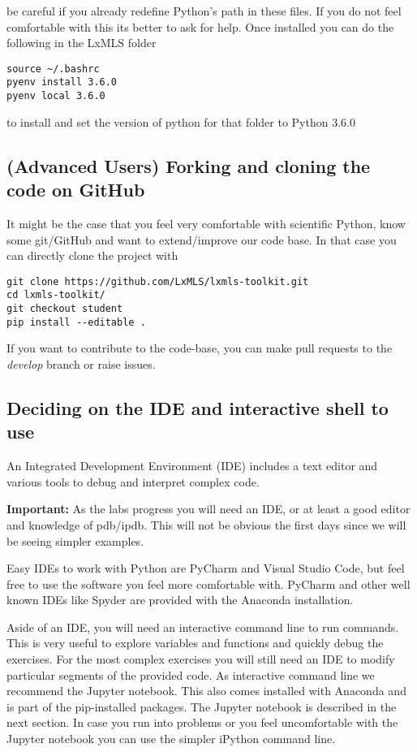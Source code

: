 be careful if you already redefine Python's path in these files. If you do not feel comfortable with this its better to ask for help. Once installed you can do the following in the LxMLS folder

\begin{verbatim}
source ~/.bashrc
pyenv install 3.6.0 
pyenv local 3.6.0
\end{verbatim}

\noindent to install and set the version of python for that folder to Python 3.6.0


\subsection{(Advanced Users) Forking and cloning the code on GitHub}

It might be the case that you feel very comfortable with scientific Python, know some git/GitHub and want to extend/improve our code base. In that case you can directly clone the project with

\begin{verbatim}
git clone https://github.com/LxMLS/lxmls-toolkit.git 
cd lxmls-toolkit/
git checkout student
pip install --editable .
\end{verbatim}

\noindent If you want to contribute to the code-base, you can make pull requests to the \textit{develop} branch or raise issues.

\subsection{Deciding on the IDE and interactive shell to use}

An Integrated Development Environment (IDE) includes a text editor and various tools to debug and interpret complex code. 

\textbf{Important:} As the labs progress you will need an IDE, or at least a good editor and knowledge of pdb/ipdb. This will not be obvious the first days since we will be seeing simpler examples.

Easy IDEs to work with Python are PyCharm and Visual Studio Code, but feel free to use the software you feel more comfortable with. PyCharm and other well known IDEs like Spyder are provided with the Anaconda installation.

Aside of an IDE, you will need an interactive command line to run commands. This is very useful to explore variables and functions and quickly debug the exercises. For the most complex exercises you will still need an IDE to modify particular segments of the provided code. As interactive command line we recommend the Jupyter notebook. This also comes installed with Anaconda and is part of the pip-installed packages. The Jupyter notebook is described in the next section. In case you run into problems or you feel uncomfortable with the Jupyter notebook you can use the simpler iPython command line.

